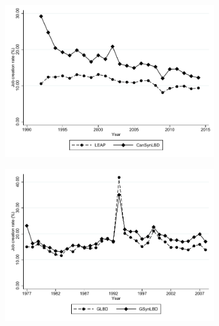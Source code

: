 \begin{figure}[t]
\begin{subfigure}[h]{0.48\linewidth}
\includegraphics[trim=0 40 0 0,clip, width=\linewidth]{graphs/Job_creation_rate_by_year_private_bw.pdf}
\end{subfigure}
\hfill
\begin{subfigure}[h]{0.48\linewidth}
\includegraphics[trim=0 40 0 0,clip,width=\linewidth]{graphs/Job_creation_rate_by_year_bw_GsynLBD.pdf}
\end{subfigure}\\
\begin{subfigure}[h]{0.48\linewidth}

\end{subfigure}
\end{figure}
